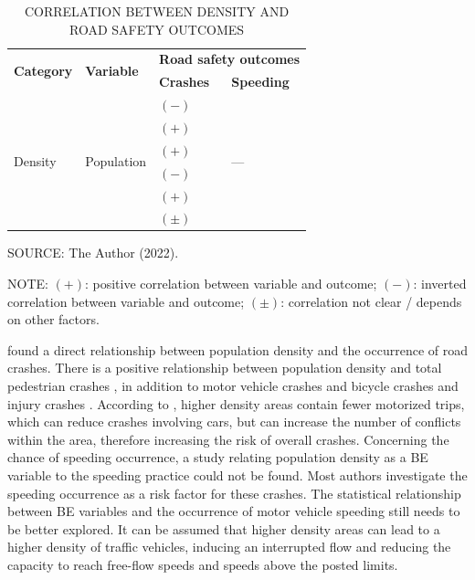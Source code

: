 \begin{table}[!hbtp]
    \footnotesize
    \captionsetup{justification=raggedright,
        singlelinecheck=false,
        font=footnotesize}
    \caption{CORRELATION BETWEEN DENSITY AND ROAD SAFETY OUTCOMES}
    \centering
    \begin{tabular}{llll}
        \hline
        \multirow{2}{*}{\textbf{Category}} & \multirow{2}{*}{\textbf{Variable}} & \multicolumn{2}{c}{\textbf{Road safety outcomes}} \\
         &  & \multicolumn{1}{l}{\textbf{Crashes}} & \multicolumn{1}{l}{\textbf{Speeding}} \\ \hline
        \multirow{6}{*}{Density} & \multirow{6}{*}{Population} & $(-)$ \textcite{Dumbaugh2009} & \multirow{6}{*}{---} \\
         &  & $(+)$ \textcite{Dumbaugh2013} &  \\
         &  & $(+)$ \textcite{Lee2015} &  \\
         &  & $(-)$ \textcite{Obelheiro2020} &  \\
         &  & $(+)$ \textcite{Pirdavani2014} &  \\
         &  & $(\pm)$ \textcite{Welle2016} &  \\ \hline
    \end{tabular}
    \label{tab:density}
    \par \vspace{2mm} \footnotesize \raggedright
    SOURCE: The Author (2022).
    \par \vspace{1mm} \footnotesize \raggedright
    NOTE: $(+)$: positive correlation between variable and outcome; $(-)$: inverted correlation between variable and outcome; $(\pm)$: correlation not clear / depends on other factors.
\end{table}

\textcite{Dumbaugh2013,Lee2015,Pirdavani2014} found a direct relationship between population density and the occurrence of road crashes. There is a positive relationship between population density and total pedestrian crashes \cite{Dumbaugh2013}, in addition to motor vehicle crashes and bicycle crashes \cite{Lee2015} and injury crashes \cite{Pirdavani2014}. According to \textcite{Welle2016}, higher density areas contain fewer motorized trips, which can reduce crashes involving cars, but can increase the number of conflicts within the area, therefore increasing the risk of overall crashes. Concerning the chance of speeding occurrence, a study relating population density as a BE variable to the speeding practice could not be found. Most authors investigate the speeding occurrence as a risk factor for these crashes. The statistical relationship between BE variables and the occurrence of motor vehicle speeding still needs to be better explored. It can be assumed that higher density areas can lead to a higher density of traffic vehicles, inducing an interrupted flow and reducing the capacity to reach free-flow speeds and speeds above the posted limits.

